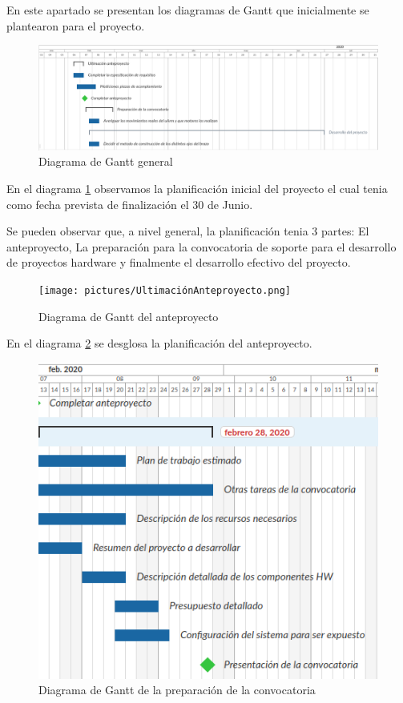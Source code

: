 En este apartado se presentan los diagramas de Gantt que inicialmente se plantearon para el proyecto.

\begin{figure}[H]
    \centering
    \includegraphics[width=1\linewidth]{pictures/DiagramaGanttGeneral.png}
    \caption{Diagrama de Gantt general}
    \label{fig:gantt_general}
\end{figure}

En el diagrama \ref{fig:gantt_general} observamos la planificación inicial del proyecto el cual tenia como fecha prevista de finalización el 30 de Junio.

Se pueden observar que, a nivel general, la planificación tenia 3 partes: El anteproyecto, La preparación para la convocatoria de soporte para el desarrollo de proyectos hardware y finalmente el desarrollo efectivo del proyecto.

\begin{figure}[H]
    \centering
    \texttt{[image: pictures/UltimaciónAnteproyecto.png]}
    \caption{Diagrama de Gantt del anteproyecto}
    \label{fig:gantt_anteproyecto}
\end{figure}

En el diagrama \ref{fig:gantt_anteproyecto} se desglosa la planificación del anteproyecto.

\begin{figure}[H]
    \centering
    \includegraphics[width=1\linewidth]{pictures/PreparacionConvocatoria.png}
    \caption{Diagrama de Gantt de la preparación de la convocatoria}
    \label{fig:gantt_convocatoria}
\end{figure}

